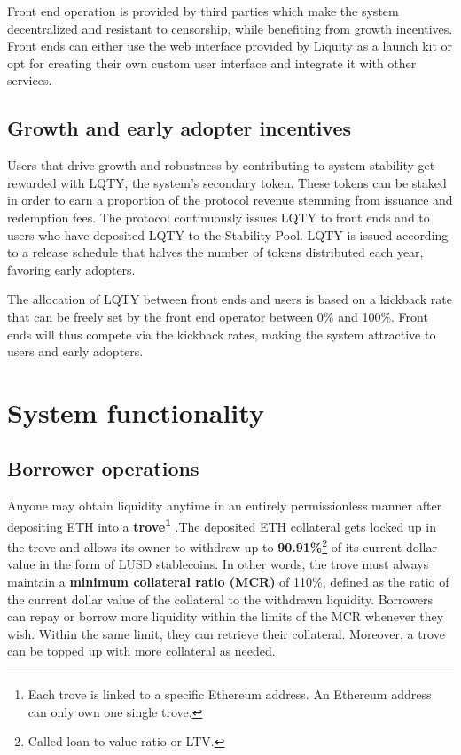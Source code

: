 \documentclass{article}
\begin{document}
Front end operation is provided by third parties which make the system decentralized and resistant to censorship, while benefiting from growth incentives. Front ends can either use the web interface provided by Liquity as a launch kit or opt for creating their own custom user interface and integrate it with other services.

\subsection{Growth and early adopter incentives}
Users that drive growth and robustness by contributing to system stability get rewarded with LQTY, the system's secondary token. These tokens can be staked in order to earn a proportion of the protocol revenue stemming from issuance and redemption fees. The protocol continuously issues LQTY to front ends and to users who have deposited LQTY to the Stability Pool. LQTY is issued according to a release schedule that halves the number of tokens distributed each year, favoring early adopters.

The allocation of LQTY between front ends and users is based on a kickback rate that can be freely set by the front end operator between 0\% and 100\%. Front ends will thus compete via the kickback rates, making the system attractive to users and early adopters.

\section{System functionality}
\subsection{Borrower operations }
Anyone may obtain liquidity anytime in an entirely permissionless manner after depositing ETH into a \textbf{trove\footnote{Each trove is linked to a specific Ethereum address. An Ethereum address can only own one single trove.} }.The deposited ETH collateral gets locked up in the trove and allows its owner to withdraw up to \textbf{90.91\%}\footnote{Called loan-to-value ratio or LTV.} of its current dollar value in the form of LUSD stablecoins. In other words, the trove must always maintain a \textbf{minimum collateral ratio (MCR)} of 110\%, defined as the ratio of the current dollar value of the collateral to the withdrawn liquidity. Borrowers can repay or borrow more liquidity within the limits of the MCR whenever they wish. Within the same limit, they can retrieve their collateral. Moreover, a trove can be topped up with more collateral as needed. \\
\end{document}
